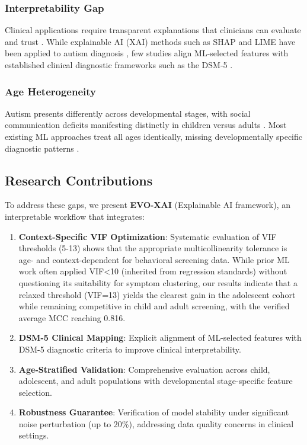 \documentclass[pdflatex,sn-vancouver-num]{sn-jnl}
\begin{document}
\subsubsection{Interpretability Gap}

Clinical applications require transparent explanations that clinicians can evaluate and trust \cite{ref16}. While explainable AI (XAI) methods such as SHAP \cite{ref17} and LIME \cite{ref18} have been applied to autism diagnosis \cite{ref19,ref20,ref21}, few studies align ML-selected features with established clinical diagnostic frameworks such as the DSM-5 \cite{ref1}.

\subsubsection{Age Heterogeneity}

Autism presents differently across developmental stages, with social communication deficits manifesting distinctly in children versus adults \cite{ref22}. Most existing ML approaches treat all ages identically, missing developmentally specific diagnostic patterns \cite{ref23}.

\subsection{Research Contributions}\label{research-contributions-1}

To address these gaps, we present \textbf{EVO-XAI} (Explainable AI framework), an interpretable workflow that integrates:

\begin{enumerate}
\def\labelenumi{\arabic{enumi}.}
\item
  \textbf{Context-Specific VIF Optimization}: Systematic evaluation of VIF thresholds (5-13) shows that the appropriate multicollinearity tolerance is age- and context-dependent for behavioral screening data. While prior ML work often applied VIF\textless10 (inherited from regression standards) without questioning its suitability for symptom clustering, our results indicate that a relaxed threshold (VIF=13) yields the clearest gain in the adolescent cohort while remaining competitive in child and adult screening, with the verified average MCC reaching 0.816.
\item
  \textbf{DSM-5 Clinical Mapping}: Explicit alignment of ML-selected features with DSM-5 diagnostic criteria to improve clinical interpretability.
\item
  \textbf{Age-Stratified Validation}: Comprehensive evaluation across child, adolescent, and adult populations with developmental stage-specific feature selection.
\item
  \textbf{Robustness Guarantee}: Verification of model stability under significant noise perturbation (up to 20\%), addressing data quality concerns in clinical settings.
\end{enumerate}
\end{document}
